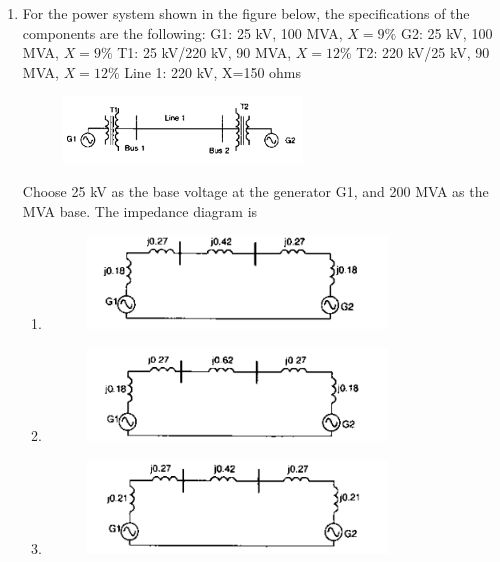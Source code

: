 \documentclass[12pt]{article}
\theoremstyle{remark}
\begin{document}
\begin{enumerate}
\item For the power system shown in the figure below, the specifications of the components are the following:
G1: 25 kV, 100 MVA, $X=9\%$
G2: 25 kV, 100 MVA, $X=9\%$
T1: 25 kV/220 kV, 90 MVA, $X=12\%$
T2: 220 kV/25 kV, 90 MVA, $X=12\%$
Line 1: 220 kV, X=150 ohms
\begin{figure}[H]
    \centering
    \includegraphics[width=0.6\textwidth]{Figs/Q44.png}
    \caption{}
    \label{fig:1.34}
\end{figure}
Choose 25 kV as the base voltage at the generator G1, and 200 MVA as the MVA base. The impedance diagram is
\begin{enumerate}
    \item \begin{figure}[H]\centering\includegraphics[width=0.8\textwidth]{Figs/Q44A.png}\caption{}\label{fig:1.35}\end{figure}
    \item \begin{figure}[H]\centering\includegraphics[width=0.8\textwidth]{Figs/Q44B.png}\caption{}\label{fig:1.36}\end{figure}
    \item \begin{figure}[H]\centering\includegraphics[width=0.8\textwidth]{Figs/Q44C.png}\caption{}\label{fig:1.37}\end{figure}

\end{enumerate}
\end{enumerate}
\end{document}
